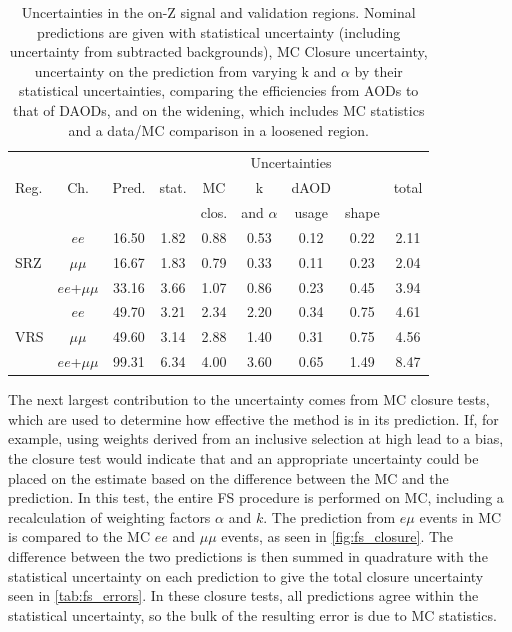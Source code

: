 \begin{table}
\begin{center}
 \begin{tabular}{lcc|cccccc}
 \hline 
 \multirow{3}{*}{Reg.}	& \multirow{3}{*}{Ch.} 	& \multirow{3}{*}{Pred.} & \multicolumn{6}{c}{Uncertainties} \\
   \cline{4-9} 
   		 	& 		 	& 	  		& stat.  		& MC 		& k  			& dAOD 		& \mll  	& total \\
   			& 			& 		 	& 			 	& clos. 	& and $\alpha$	& usage	 	& shape  	& \\
   \hline
   \hline
\multirow{3}{*}{SRZ}
& $ee$ & 16.50 & 1.82 & 0.88 & 0.53 & 0.12 & 0.22 & 2.11 \\ 
& $\mu\mu$ & 16.67 & 1.83 & 0.79 & 0.33 & 0.11 & 0.23 & 2.04 \\ 
& $ee$+$\mu\mu$ & 33.16 & 3.66 & 1.07 & 0.86 & 0.23 & 0.45 & 3.94 \\ 
\hline
\multirow{3}{*}{VRS}
& $ee$ & 49.70 & 3.21 & 2.34 & 2.20 & 0.34 & 0.75 & 4.61 \\ 
& $\mu\mu$ & 49.60 & 3.14 & 2.88 & 1.40 & 0.31 & 0.75 & 4.56 \\ 
& $ee$+$\mu\mu$ & 99.31 & 6.34 & 4.00 & 3.60 & 0.65 & 1.49 & 8.47 \\ 
\hline
 
\hline
\hline
 \end{tabular}
\end{center}
 \caption{
   Uncertainties in the on-Z signal and validation regions. Nominal predictions are given with statistical uncertainty (including uncertainty from subtracted backgrounds), MC Closure uncertainty, uncertainty on the prediction from varying k and $\alpha$ by their statistical uncertainties, comparing the efficiencies from AODs to that of DAODs, and on the \mll widening, which includes MC statistics and a data/MC comparison in a loosened region.
 }
 \label{tab:fs_errors}
\end{table}

The next largest contribution to the uncertainty comes from \ac{MC} closure tests, which are used to determine how effective the method is in its prediction. If, for example, using weights derived from an inclusive selection at high \met lead to a bias, the closure test would indicate that and an appropriate uncertainty could be placed on the estimate based on the difference between the \ac{MC} and the prediction. In this test, the entire \ac{FS} procedure is performed on \ttbar \ac{MC}, including a recalculation of weighting factors $\alpha$ and $k$. The prediction from $e\mu$ events in \ac{MC} is compared to the \ac{MC} $ee$ and $\mu\mu$ events, as seen in \autoref{fig:fs_closure}. The difference between the two predictions is then summed in quadrature with the statistical uncertainty on each prediction to give the total closure uncertainty seen in \autoref{tab:fs_errors}. In these closure tests, all predictions agree within the statistical uncertainty, so the bulk of the resulting error is due to \ac{MC} statistics. 

